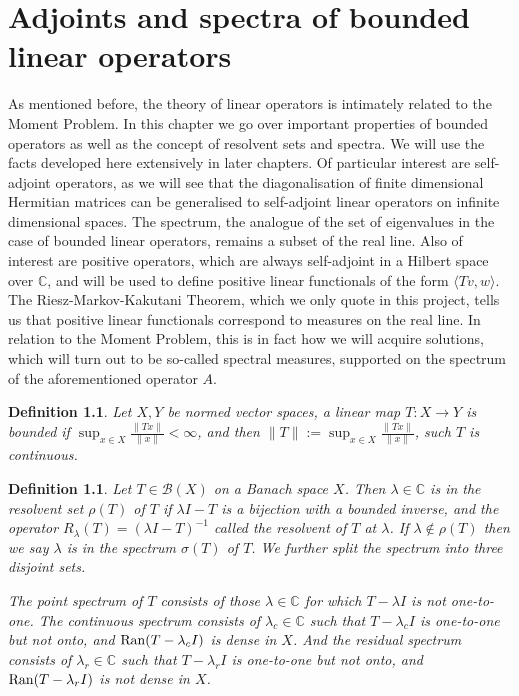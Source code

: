\documentclass[12pt,oneside]{report}
\newtheorem{defn}[thm]{Definition}
\begin{document}


\chapter{Adjoints and spectra of bounded linear operators}\label{ch2}

As mentioned before, the theory of linear operators is intimately related to the Moment Problem. In this chapter we go over important properties of bounded operators as well as the concept of resolvent sets and spectra. We will use the facts developed here extensively in later chapters. Of particular interest are self-adjoint operators, as we will see that the diagonalisation of finite dimensional Hermitian matrices can be generalised to self-adjoint linear operators on infinite dimensional spaces. The spectrum, the analogue of the set of eigenvalues in the case of bounded linear operators, remains a subset of the real line. Also of interest are positive operators, which are always self-adjoint in a Hilbert space over $\mathbb{C}$, and will be used to define positive linear functionals of the form $\langle Tv, w \rangle$. The Riesz-Markov-Kakutani Theorem, which we only quote in this project, tells us that
positive linear functionals correspond to measures on the real line. In relation to the Moment Problem, this is in fact how we will acquire solutions, which will turn out to be so-called spectral measures, supported on the spectrum of the aforementioned operator $A$.

\begin{defn}
    Let $X,Y$ be normed vector spaces, a linear map $T: X \to Y$ is bounded if $\sup_{x \in X} \frac{\|Tx\|}{\|x\|} < \infty$, and then $\|T\| := \sup_{x \in X} \frac{\|Tx\|}{\|x\|}$, such $T$ is continuous.
\end{defn}

\begin{defn}
    Let $T \in \mathscr{B}(X)$ on a Banach space $X$. Then $\lambda \in \mathbb{C}$ is in the resolvent set $\rho(T)$ of $T$ if $\lambda I - T$ is a bijection with a bounded inverse, and the operator $R_{\lambda}(T) = (\lambda I - T)^{-1}$ called the resolvent of $T$ at $\lambda$. If $\lambda \notin \rho(T)$ then we say $\lambda$ is in the spectrum $\sigma(T)$ of $T$. We further split the spectrum into three disjoint sets.
    
    The point spectrum of $T$ consists of those $\lambda \in \mathbb{C}$ for which $T - \lambda I$ is not one-to-one. The continuous spectrum consists of $\lambda_{c} \in \mathbb{C}$ such that $T - \lambda_{c} I$ is one-to-one but not onto, and $\mathrm{Ran}(T - \lambda_{c}I)$ is dense in $X$. And the residual spectrum consists of $\lambda_{r} \in \mathbb{C}$ such that $T - \lambda_{r}I$ is one-to-one but not onto, and $\mathrm{Ran}(T - \lambda_{r}I)$ is not dense in $X$.
\end{defn}
\end{document}
